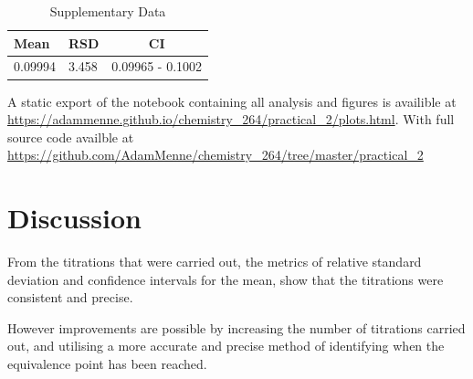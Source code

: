 \documentclass[a4paper, british]{article}
\begin{document}
\vspace{25mm}

\begin{table}[h]
    \centering
    \caption{Supplementary Data}
    \begin{tabular}{llc}
        \addlinespace
        \toprule
        Mean & RSD & CI\\ 
        \midrule
        0.09994 & 3.458 & 0.09965 - 0.1002\\
        \bottomrule
        \end{tabular}
        \label{table:data}   
\end{table}

A static export of the notebook containing all analysis and figures is availible at \url{https://adammenne.github.io/chemistry_264/practical_2/plots.html}. With full source code availble at \url{https://github.com/AdamMenne/chemistry_264/tree/master/practical_2}

\section{Discussion}

From the titrations that were carried out, the metrics of relative standard deviation and confidence intervals for the mean, show that the titrations were consistent and precise. 

However improvements are possible by increasing the number of titrations carried out, and utilising a more accurate and precise method of identifying when the equivalence point has been reached.

\newpage
\end{document}
